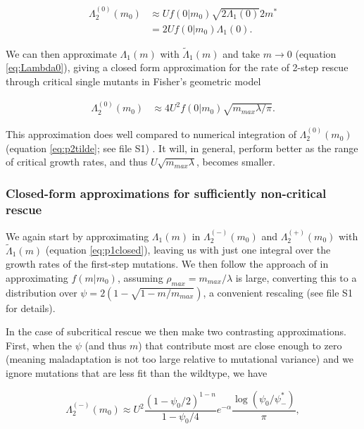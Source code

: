 \documentclass[9pt,twocolumn,twoside,lineno]{gsajnl}
\begin{document}
\begin{equation}\label{eq:p20app1}
\begin{aligned}
\Lambda_2^{(0)}(m_0)
&\approx U f(0|m_0)  \sqrt{2\Lambda_1(0)} 2m^*\\
&= 2 U f(0|m_0) \Lambda_1(0).
\end{aligned}
\end{equation}

\noindent We can then approximate $\Lambda_1(m)$ with $\tilde{\Lambda}_1(m)$ \citep[equation \ref{eq:p1closed}; for details see file S1 and][]{Anciaux2018} and take $m\rightarrow0$ (equation \ref{eq:Lambda0}), giving a closed form approximation for the rate of 2-step rescue through critical single mutants in Fisher's geometric model

\begin{equation}\label{eq:p20app}
\begin{aligned}
\Lambda_2^{(0)}(m_0)
&\approx 4 U^2 f(0|m_0)  \sqrt{m_{max} \lambda/ \pi}.
\end{aligned}
\end{equation}

\noindent This approximation does well compared to numerical integration of $\Lambda_2^{(0)}(m_0)$  (equation \ref{eq:p2tilde}; see file S1) . 
It will, in general, perform better as the range of critical growth rates, and thus $U \sqrt{m_{max} \lambda}$, becomes smaller.

\subsubsection{Closed-form approximations for sufficiently non-critical rescue}
We again start by approximating $\Lambda_1(m)$ in $\Lambda_2^{(-)}(m_0)$ and $\Lambda_2^{(+)}(m_0)$ with $\tilde{\Lambda}_1(m)$ (equation \ref{eq:p1closed}), leaving us with just one integral over the growth rates of the first-step mutations.
We then follow the approach of \cite{Anciaux2018} in approximating $f(m|m_0)$, assuming $\rho_{max} = m_{max}/\lambda$ is large, converting this to a distribution over $\psi = 2(1-\sqrt{1-m/m_{max}})$, a convenient rescaling (see file S1 for details).

In the case of subcritical rescue we then make two contrasting approximations.
First, when the $\psi$ (and thus $m$) that contribute most are close enough to zero (meaning maladaptation is not too large relative to mutational variance) and we ignore mutations that are less fit than the wildtype, we have

\begin{equation}\label{eq:Lambda2_smallPsi}
\Lambda_2^{(-)}(m_0) \approx U^2 \frac{(1-\psi_0/2)^{1-n}}{1-\psi_0/4} e^{-\alpha} \frac{\log(\psi_0 / \psi^*_{-})}{\pi},
\end{equation}
\end{document}
